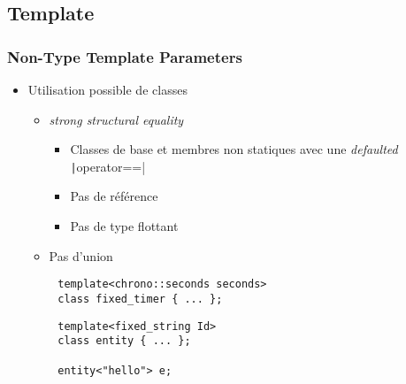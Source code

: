 \documentclass[C++.tex]{subfiles}
\begin{document}
\subsection*{Template}
\begin{frame}[fragile]
	\frametitle{Non-Type Template Parameters}
	\begin{itemize}
		\item Utilisation possible de classes
		\begin{itemize}
			\item \textit{strong structural equality}
			\begin{itemize}
				\item Classes de base et membres non statiques avec une \textit{defaulted} \texttt|operator==|
				\item Pas de référence
				\item Pas de type flottant
			\end{itemize}
			\item Pas d'union
		\end{itemize}
	\end{itemize}

	\begin{verbatim}
		template<chrono::seconds seconds>
		class fixed_timer { ... };
	\end{verbatim}


	\begin{verbatim}
		template<fixed_string Id>
		class entity { ... };

		entity<"hello"> e;
	\end{verbatim}

\end{frame}
\end{document}
